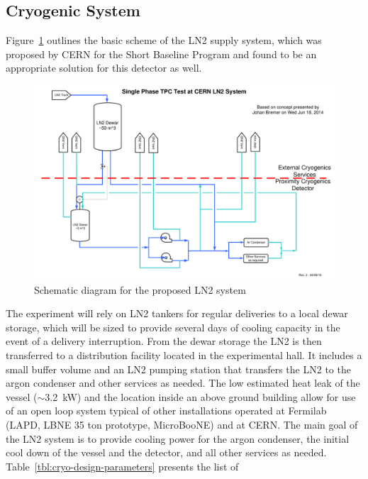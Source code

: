 \subsection{Cryogenic System}

Figure~\ref{fig:proposed-LN2-system} outlines the basic scheme of the LN2 supply system, which was 
proposed by CERN for the Short Baseline Program and found to be an appropriate solution for this 
detector as well. 
%
\begin{figure}[htb]
\begin{center}
\includegraphics[width=.95\textwidth]{figures/proposed-LN2-system} 
\caption[Schematic diagram for the proposed LN2 system.]{\label{fig:proposed-LN2-system}Schematic diagram for the proposed LN2 system}
\end{center}
\end{figure}
%
The experiment will rely on LN2 tankers for regular deliveries to a local dewar storage, 
which will be sized to provide several days of cooling capacity in the event of a delivery interruption. 
From the dewar storage the LN2 is then transferred to a distribution facility located in the experimental 
hall. It includes a small buffer volume and an LN2 pumping station that transfers the LN2 to the argon 
condenser and other services as needed. The low estimated heat leak of the vessel ($\sim$3.2~kW) and the 
location inside an above ground building allow for use of an open loop system typical of other 
installations operated at Fermilab (LAPD, LBNE 35 ton prototype, MicroBooNE) and at CERN. 
The main goal of the LN2 system is to provide cooling power for the argon condenser, the initial cool down of 
the vessel and the detector, and all other services as needed.
%
 Table~\ref{tbl:cryo-design-parameters} presents the list of 
